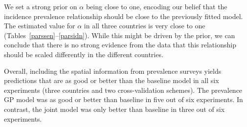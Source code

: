 \documentclass{statsoc}
\begin{document}
We set a strong prior on $\alpha$ being close to one, encoding our belief that the incidence prevalence relationship should be close to the previously fitted model.
The estimated value for $\alpha$ in all three countries is very close to one (Tables~\ref{parssen}--\ref{parsidn}).
While this might be driven by the prior, we can conclude that there is no strong evidence from the data that this relationship should be scaled differently in the different countries.


Overall, including the spatial information from prevalence surveys yields predictions that are as good or better than the baseline model in all six experiments (three countries and two cross-validation schemes).
The prevalence GP model was as good or better than baseline in five out of six experiments.
In contrast, the joint model was only better than baseline in three out of six experiments.




\end{document}
